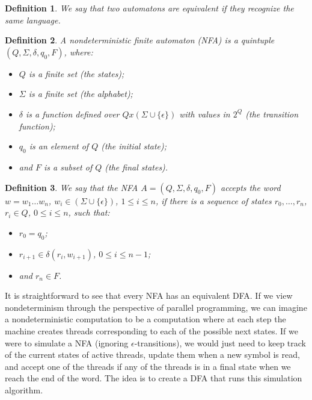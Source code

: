 \documentclass[12pt, a4paper]{article}
\theoremstyle{break}
\newtheorem{definition}{Definition}
\begin{document}
\begin{definition}
  We say that two automatons are equivalent if they recognize the same language.
\end{definition}
  
\begin{definition}
  A nondeterministic finite automaton (NFA) is a quintuple
$(Q,\Sigma,\delta,q_0,F)$, where:
\begin{itemize}
  \item $Q$ is a finite set (the states);
  \item $\Sigma$ is a finite set (the alphabet);
  \item $\delta$ is a function defined over $Q x (\Sigma \cup \{\epsilon\})$ with values in
     $2^Q$ (the transition function);
  \item $q_0$ is an element of $Q$ (the initial state);
  \item and $F$ is a subset of $Q$ (the final states).
\end{itemize}
\end{definition}

\begin{definition}
  We say that the NFA $A = (Q,\Sigma,\delta,q_0,F)$ accepts the word $w = w_1
\ldots w_n$, $w_i \in (\Sigma \cup \{\epsilon \})$, $1 \leq i \leq n$, if there
is a sequence of states $r_0, \ldots, r_n$, $r_i \in Q$, $0 \leq i \leq n$, such
that:
\begin{itemize}
  \item $r_0 = q_0$;
  \item $r_{i+1} \in \delta(r_i, w_{i+1})$, $0 \leq i \leq n-1$;
  \item and $r_n \in F$.
\end{itemize}
\end{definition}
  
It is straightforward to see that every NFA has an equivalent DFA. If we view
nondeterminism through the perspective of parallel programming, we can imagine a
nondeterministic computation to be a computation where at each step the machine
creates threads corresponding to each of the possible next states. If we were
to simulate a NFA (ignoring $\epsilon$-transitions), we would just need to keep
track of the current states of active threads, update them when a new symbol is
read, and accept one of the threads if any of the threads is in a final state
when we reach the end of the word. The idea is to create a DFA that runs this
simulation algorithm.

\end{document}
